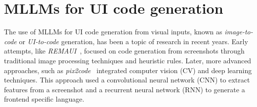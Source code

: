 \section{MLLMs for UI code generation}
The use of MLLMs for UI code generation from visual inputs, 
known as \textit{image-to-code} or \textit{UI-to-code} generation, has 
been a topic of research in recent years.
Early attempts, like \textit{REMAUI}~\parencite{nguyen2015reverse}, focused on
code generation from screenshots through traditional image processing 
techniques and heuristic rules. Later, more advanced approaches, such as 
\textit{pix2code}~\parencite{beltramelli2017pix2code} integrated 
computer vision (CV) and deep learning techniques. This 
approach used a convolutional neural network (CNN) to extract
features from a screenshot and a recurrent neural network (RNN) to 
generate a frontend specific language.\newline

